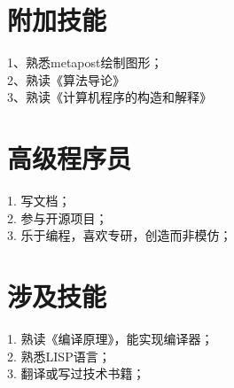 \documentclass[11pt,a4paper]{book}
\begin{document}
\begin{CJK*}{UTF8}{nsung}
\section{附加技能}
    1、熟悉metapost绘制图形；\\
    2、熟读《算法导论》\\
    3、熟读《计算机程序的构造和解释》\\

\section{高级程序员}
    1. 写文档；\\
    2. 参与开源项目；\\
    3. 乐于编程，喜欢专研，创造而非模仿；\\

\section{涉及技能}
    1. 熟读《编译原理》，能实现编译器；\\
    2. 熟悉LISP语言；\\
    3. 翻译或写过技术书籍；\\
   
    

\end{CJK*}
\end{document}
